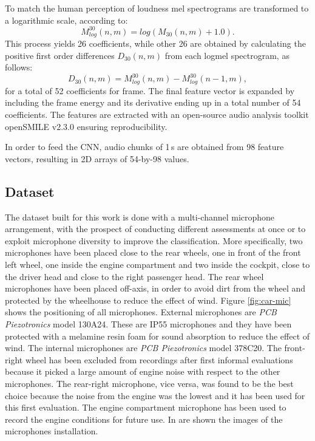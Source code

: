 To match the human perception of loudness mel spectrograms are transformed to a logarithmic scale, according to:
\begin{equation}
M_{log}^{30}(n,m) = log(M_{30}(n,m) + 1.0).
\end{equation}
This process yields 26 coefficients, while other 26 are obtained by calculating the positive first order differences $D_{30}(n,m)$ from each logmel spectrogram, as follows:
\begin{equation}
D_{30}(n,m)  = M_{log}^{30}(n,m)-M_{log}^{30}(n-1,m),
\end{equation}
for a total of 52 coefficients for frame. The final feature vector is expanded by including the frame energy and its derivative ending up in a total number of 54 coefficients. %
The features are extracted with an open-source audio analysis toolkit openSMILE v2.3.0 \cite{Eyben13-RDI} ensuring reproducibility.


In order to feed the CNN, audio chunks of 1\,s are obtained from 98 feature vectors, resulting in 2D arrays of 54-by-98 values.

\subsection{Dataset}

The dataset built for this work is done with a multi-channel microphone arrangement, with the prospect of conducting different assessments at once or to exploit microphone diversity to improve the classification. More specifically, two microphones have been placed close to the rear wheels, one in front of the front left wheel, one inside the engine compartment and two inside the cockpit, close to the driver head and close to the right passenger head. The rear wheel microphones have been placed off-axis, in order to avoid dirt from the wheel and protected by the wheelhouse to reduce the effect of wind. Figure \ref{fig:car-mic} shows the positioning of all microphones. External microphones are \textit{PCB Piezotronics} model 130A24. These are IP55 microphones and they have been protected with a melamine resin foam for sound absorption to reduce the effect of wind. The internal microphones are \textit{PCB Piezotronics} model 378C20. The front-right wheel has been excluded from recordings after first informal evaluations because it picked a large amount of engine noise with respect to the other microphones. The rear-right microphone, vice versa, was found to be the best choice because the noise from the engine was the lowest and it has been used for this first evaluation. The engine compartment microphone has been used to record the engine conditions for future use. In  are shown the images of the microphones installation. 


